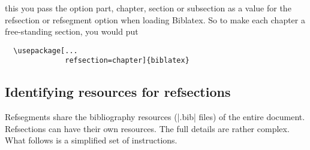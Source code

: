 \begin{enumerate}
  this you pass the option part, chapter, section or subsection as a
  value for the refsection or refsegment option when loading Biblatex.
  So to make each chapter a free-standing section, you would put
  \begin{marginfigure}
  \end{marginfigure}
\begin{verbatim}
  \usepackage[...
              refsection=chapter]{biblatex}
\end{verbatim}
\end{enumerate}

\subsection{Identifying resources for refsections}

Refsegments share the bibliography resources (|.bib| files) of
the entire document. Refsections can have their own resources. The full
details are rather complex. What follows is a simplified set of
instructions.

